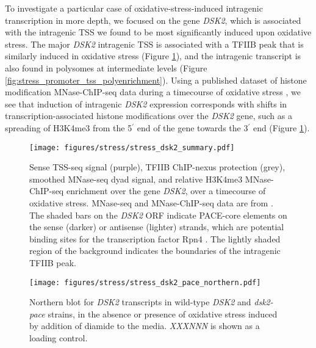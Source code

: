To investigate a particular case of oxidative-stress-induced intragenic transcription in more depth, we focused on the gene \textit{DSK2}, which is associated with the intragenic TSS we found to be most significantly induced upon oxidative stress.
The major \textit{DSK2} intragenic TSS is associated with a TFIIB peak that is similarly induced in oxidative stress (Figure \ref{fig:stress_dsk2_summary}), and the intragenic transcript is also found in polysomes at intermediate levels (Figure \ref{fig:stress_promoter_tss_polyenrichment}).
Using a published dataset of histone modification MNase-ChIP-seq data during a timecourse of oxidative stress \citep{weiner2015}, we see that induction of intragenic \textit{DSK2} expression corresponds with shifts in transcription-associated histone modifications over the \textit{DSK2} gene, such as a spreading of H3K4me3 from the 5$^\prime$ end of the gene towards the 3$^\prime$ end (Figure \ref{fig:stress_dsk2_summary}).
\begin{figure}[h]
    \texttt{[image: figures/stress/stress\_dsk2\_summary.pdf]}
    \caption[Sense TSS-seq signal, TFIIB ChIP-nexus protection, and MNase-ChIP-seq data at the \textit{DSK2} gene, over an oxidative stress timecourse.]{Sense TSS-seq signal (purple), TFIIB ChIP-nexus protection (grey), smoothed MNase-seq dyad signal, and relative H3K4me3 MNase-ChIP-seq enrichment over the gene \textit{DSK2}, over a timecourse of oxidative stress. MNase-seq and MNase-ChIP-seq data are from \citet{weiner2015}. The shaded bars on the \textit{DSK2} ORF indicate PACE-core elements on the sense (darker) or antisense (lighter) strands, which are potential binding sites for the transcription factor Rpn4 \citep{shirozu2015}. The lightly shaded region of the background indicates the boundaries of the intragenic TFIIB peak.}
    \label{fig:stress_dsk2_summary}
\end{figure}

\begin{wrapfigure}[9]{r}{3in}
    \centering
    \texttt{[image: figures/stress/stress\_dsk2\_pace\_northern.pdf]}
    \caption[Northern blot for \textit{DSK2} transcripts in wild-type \textit{DSK2} and \textit{dsk2-pace} strains, in the absence or presence of oxidative stress.]{Northern blot for \textit{DSK2} transcripts in wild-type \textit{DSK2} and \textit{dsk2-pace} strains, in the absence or presence of oxidative stress induced by addition of diamide to the media. \textit{XXXNNN} is shown as a loading control.}
    \label{fig:stress_dsk2_pace_northern}
\end{wrapfigure}

